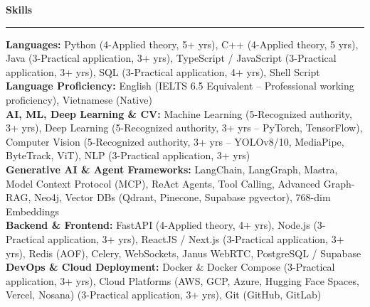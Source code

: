 \documentclass[10pt,a4paper]{article}
\newcommand{\sectionhr}[1]{%
  \vspace{0.4em}\noindent\textbf{\large #1}\par
  \vspace{0.2em}\hrule\vspace{0.4em}
}
\begin{document}
\sectionhr{Skills}
\textbf{Languages:} Python (4-Applied theory, 5+ yrs), C++ (4-Applied theory, 5 yrs), Java (3-Practical application, 3+ yrs), TypeScript / JavaScript (3-Practical application, 3+ yrs), SQL (3-Practical application, 4+ yrs), Shell Script \\
\textbf{Language Proficiency:} English (IELTS 6.5 Equivalent -- Professional working proficiency), Vietnamese (Native) \\
\textbf{AI, ML, Deep Learning \& CV:} Machine Learning (5-Recognized authority, 3+ yrs), Deep Learning (5-Recognized authority, 3+ yrs -- PyTorch, TensorFlow), Computer Vision (5-Recognized authority, 3+ yrs -- YOLOv8/10, MediaPipe, ByteTrack, ViT), NLP (3-Practical application, 3+ yrs) \\
\textbf{Generative AI \& Agent Frameworks:} LangChain, LangGraph, Mastra, Model Context Protocol (MCP), ReAct Agents, Tool Calling, Advanced Graph-RAG, Neo4j, Vector DBs (Qdrant, Pinecone, Supabase pgvector), 768-dim Embeddings \\
\textbf{Backend \& Frontend:} FastAPI (4-Applied theory, 4+ yrs), Node.js (3-Practical application, 3+ yrs), ReactJS / Next.js (3-Practical application, 3+ yrs), Redis (AOF), Celery, WebSockets, Janus WebRTC, PostgreSQL / Supabase \\
\textbf{DevOps \& Cloud Deployment:} Docker \& Docker Compose (3-Practical application, 3+ yrs), Cloud Platforms (AWS, GCP, Azure, Hugging Face Spaces, Vercel, Nosana) (3-Practical application, 3+ yrs), Git (GitHub, GitLab)
\end{document}
